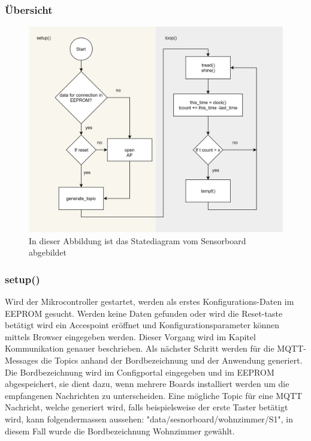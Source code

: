 \subsubsection{	Übersicht} 
\begin{figure}[H]
	\centering
	\includegraphics[width=\textwidth]{graphics/StatemaschineSensor.png}
	\caption{In dieser Abbildung ist das Statediagram vom Sensorboard abgebildet}
	\label{pic: statemaschine sensor}
\end{figure} 

\newpage

\subsubsection{setup()}\label{subsubsec: sensor setup}
Wird der Mikrocontroller gestartet, werden als erstes Konfigurations-Daten im EEPROM gesucht. Werden keine Daten gefunden oder wird die Reset-taste betätigt wird ein Accespoint eröffnet und Konfigurationsparameter können mittels Browser eingegeben werden. Dieser Vorgang wird im Kapitel Kommunikation genauer beschrieben. Als nächster Schritt werden für die MQTT-Messages die Topics anhand der Bordbezeichnung und der Anwendung generiert. Die Bordbezeichnung wird im Configportal eingegeben und im EEPROM abgespeichert, sie dient dazu, wenn mehrere Boards installiert werden um die empfangenen Nachrichten zu unterscheiden. Eine mögliche Topic für eine MQTT Nachricht, welche generiert wird, falls beispielsweise der erste Taster betätigt wird, kann folgendermassen aussehen: "data/sesnorboard/wohnzimmer/S1", in diesem Fall wurde die Bordbezeichnung Wohnzimmer gewählt. 

